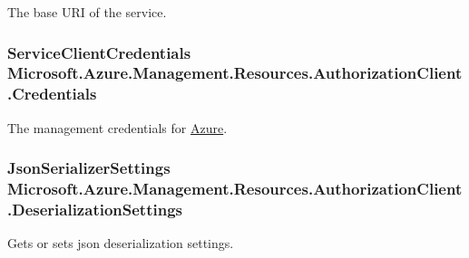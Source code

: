 The base U\+RI of the service. 

\subsubsection[{\texorpdfstring{Credentials}{Credentials}}]{\setlength{\rightskip}{0pt plus 5cm}Service\+Client\+Credentials Microsoft.\+Azure.\+Management.\+Resources.\+Authorization\+Client.\+Credentials\hspace{0.3cm}{\ttfamily [get]}}\hypertarget{class_microsoft_1_1_azure_1_1_management_1_1_resources_1_1_authorization_client_ab3e8f6c5773d14a5e823b538b0a611b5}{}\label{class_microsoft_1_1_azure_1_1_management_1_1_resources_1_1_authorization_client_ab3e8f6c5773d14a5e823b538b0a611b5}


The management credentials for \hyperlink{namespace_microsoft_1_1_azure}{Azure}. 

\subsubsection[{\texorpdfstring{Deserialization\+Settings}{DeserializationSettings}}]{\setlength{\rightskip}{0pt plus 5cm}Json\+Serializer\+Settings Microsoft.\+Azure.\+Management.\+Resources.\+Authorization\+Client.\+Deserialization\+Settings\hspace{0.3cm}{\ttfamily [get]}}\hypertarget{class_microsoft_1_1_azure_1_1_management_1_1_resources_1_1_authorization_client_ace10f5afa40a9941ca088971029ad524}{}\label{class_microsoft_1_1_azure_1_1_management_1_1_resources_1_1_authorization_client_ace10f5afa40a9941ca088971029ad524}


Gets or sets json deserialization settings. 

